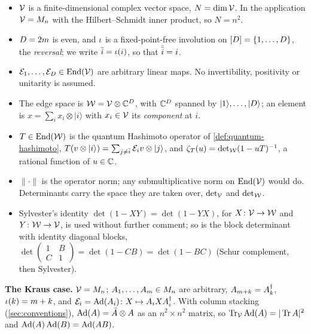 \begin{itemize}
  \item $\mathcal V$ is a finite-dimensional complex vector space, $N = \dim\mathcal V$. In the application $\mathcal V = M_n$ with the Hilbert--Schmidt inner
  product, so $N = n^2$.
  \item $D = 2m$ is even, and $\iota$ is a fixed-point-free involution on $[D] = \{1,\dots,D\}$, the \emph{reversal}; we write
  $\bar{i} = \iota(i)$, so that $\bar{\bar{i}} = i$.
  \item $\mathcal E_{1},\dots,\mathcal E_{D}\in\operatorname{End}(\mathcal V)$ are arbitrary linear maps. No invertibility, positivity or unitarity is assumed.
  \item The edge space is $\mathcal W = \mathcal V\otimes\mathbb C^{D}$, with $\mathbb C^{D}$ spanned by $|1\rangle,\dots,|D\rangle$; an element is
  $x = \sum_i x_i\otimes|i\rangle$ with $x_i\in\mathcal V$ its \emph{component} at $i$.
  \item $T\in\operatorname{End}(\mathcal W)$ is the quantum Hashimoto operator of \cref{def:quantum-hashimoto}, $T(v\otimes|i\rangle) =
  \sum_{j\ne\bar{i}}\mathcal E_{i}v\otimes|j\rangle$, and $\zeta_{T}(u) = \det\nolimits_{\mathcal W}(1-uT)^{-1}$, a rational function of
  $u\in\mathbb C$.
  \item $\|\cdot\|$ is the operator norm; any submultiplicative norm on $\operatorname{End}(\mathcal V)$ would do. Determinants carry the space they
  are taken over, $\det\nolimits_{\mathcal V}$ and $\det\nolimits_{\mathcal W}$.
  \item Sylvester's identity $\det(1-XY) = \det(1-YX)$, for $X\colon\mathcal V\to\mathcal W$ and $Y\colon\mathcal W\to\mathcal V$, is used without further comment; so
  is the block determinant with identity diagonal blocks, $\det\left(\begin{smallmatrix}1 & B\\ C & 1\end{smallmatrix}\right) = \det(1-CB) =
  \det(1-BC)$ (Schur complement, then Sylvester).
\end{itemize}

\noindent\textbf{The Kraus case.} $\mathcal V = M_n$; $A_{1},\dots,A_{m}\in M_n$ are arbitrary, $A_{m+k} = A_{k}^\dagger$, $\iota(k)
= m+k$, and $\mathcal E_{i} = \operatorname{Ad}(A_{i})\colon X\mapsto A_{i}XA_{i}^\dagger$. With column stacking (\cref{sec:conventions}), $\operatorname{Ad}(A) =
\bar A\otimes A$ as an $n^2\times n^2$ matrix, so $\operatorname{Tr}_{\mathcal V}\operatorname{Ad}(A) = |\operatorname{Tr} A|^2$ and $\operatorname{Ad}(A)\operatorname{Ad}(B) = \operatorname{Ad}(AB)$.

